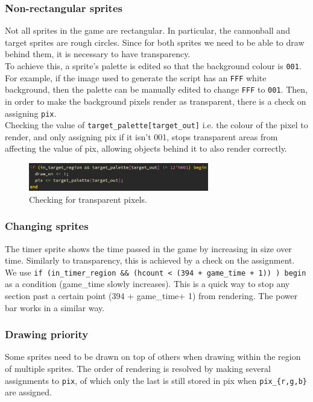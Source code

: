 \documentclass{ifda}
\begin{document}
\subsubsection{Non-rectangular sprites}
Not all sprites in the game are rectangular. In particular, the cannonball and target sprites are rough circles. Since for both sprites we need to be able to draw behind them, it is necessary to have transparency.\\

To achieve this, a sprite's palette is edited so that the background colour is \verb|001|. For example, if the image used to generate the script has an \verb|FFF| white background, then the palette can be manually edited to change \verb|FFF| to \verb|001|. Then, in order to make the background pixels render as transparent, there is a check on assigning \verb|pix|.\\
Checking the value of \verb|target_palette[target_out]| i.e. the colour of the pixel to render, and only assigning pix if it isn't 001, stops transparent areas from affecting the value of pix, allowing objects behind it to also render correctly.\\

\begin{figure}[h]
    \centering
    \includegraphics[width=0.7\textwidth]{ tgt2 }
    \caption{Checking for transparent pixels.}
    \label{fig:sync_assignment}
\end{figure}

\subsubsection{Changing sprites} %
The timer sprite shows the time passed in the game by increasing in size over time. Similarly to transparency, this is achieved by a check on the assignment. We use \verb|if (in_timer_region && (hcount < (394 + game_time + 1)) ) begin| as a condition (game\_time slowly increases). This is a quick way to stop any section past a certain point (394 + game\_time+ 1) from rendering. The power bar works in a similar way.\\

\subsubsection{Drawing priority}
Some sprites need to be drawn on top of others when drawing within the region of multiple sprites. The order of rendering is resolved by making several assignments to \verb|pix|, of which only the last is still stored in pix when \verb|pix_{r,g,b}| are assigned.\\
\end{document}
